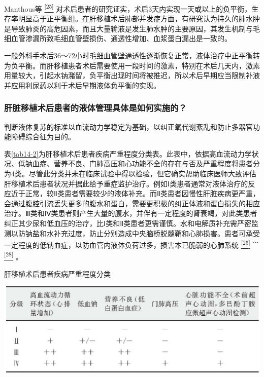 Manthous等
\protect\hyperlink{text00020.htmlux5cux23ch25-19}{\textsuperscript{{[}25{]}}}
对术后患者的研究证实，术后3天内实现一天或以上的负平衡，生存率明显高于正平衡组。在肝移植术后肺部并发症方面，有研究认为持久的肺水肿是导致肺炎的高危因素，而且大量输液是发生肺水肿的主要原因，其发生机制与毛细血管渗漏所致毛细血管壁损伤、通透性增加、血浆蛋白漏出是一致的。

一般外科手术后36～72小时毛细血管壁通透性逐渐恢复正常，液体治疗中正平衡转为负平衡。而肝移植患者术后需要使用一段时间的激素，特别在术后几天内，激素用量较大，引起水钠潴留，负平衡出现时间将被推迟，所以术后早期应当限制补液并应用利尿药以利于术后早期液体负平衡的实现。

\subsubsection{肝脏移植术后患者的液体管理具体是如何实施的？}

判断液体复苏的标准以血流动力学稳定为基础，以纠正氧代谢紊乱和防止多器官功能障碍综合征为目的。

表\ref{tab14-2}为肝移植术后患者疾病严重程度分类表。此表中，依据高血流动力学状况、低钠血症、营养不良、门肺高压和心功能不全的存在与否及严重程度将患者分为4类。尽管此分类并未在临床试验中得以检验，但它确实帮助临床医师大致评估肝移植术后患者状况并据此给予重症监护治疗。例如Ⅰ类患者通常对液体治疗的反应近于正常，较Ⅱ类患者需要较少的液体补充。而Ⅱ类患者因慢性肝脏疾病更严重，会通过腹腔引流丢失更多的腹水和蛋白，需要更积极的纠正体液和蛋白损失的相应治疗。Ⅲ类和Ⅳ类患者则产生大量的腹水，并伴有一定程度的肾衰竭，对此类患者纠正其少尿和低血压的治疗，比Ⅰ类和Ⅱ类患者更需谨慎。水和电解质补充需严密监测以防钠盐和水补充过度，防止分别造成中央脑桥脱髓鞘和心肺损害。患者可承受一定程度的低钠血症，以防血管内液体负荷过多，损害本已脆弱的心肺系统
\protect\hyperlink{text00020.htmlux5cux23ch25-19}{\textsuperscript{{[}25{]}}}
\textsuperscript{～}
\protect\hyperlink{text00020.htmlux5cux23ch28-19}{\textsuperscript{{[}28{]}}}
。

\begin{table}[htbp]
\centering
\caption{肝移植术后患者疾病严重程度分类}
\label{tab14-2}
\includegraphics{./images/Image00110.jpg}
\end{table}

